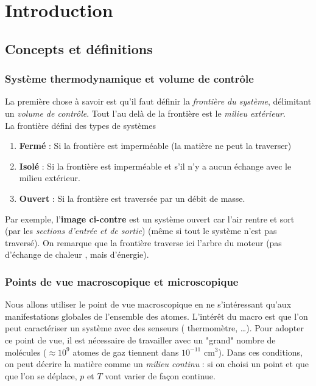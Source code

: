 \chapter{Introduction} 

	\setcounter{section}{1}
\section{Concepts et définitions}
	\subsection{Système thermodynamique et volume de contrôle}
	La première chose à savoir est qu'il faut définir la \textit{frontière 
	du système}, délimitant un \textit{volume de contrôle}. Tout l'au delà 
	de la frontière est le \textit{milieu extérieur}.\\
	
	La frontière défini des types de systèmes
	\begin{enumerate}
	\item \textbf{Fermé} : Si la frontière est imperméable (la matière ne 
	peut la traverser)
	\item \textbf{Isolé} : Si la frontière est imperméable et s'il n'y a 
	aucun échange avec le milieu extérieur.
	\item \textbf{Ouvert} : Si la frontière est traversée par un débit de 
	masse.
	\end{enumerate}

	Par exemple, l'\textbf{image ci-contre} est un système ouvert car l'air 
	rentre et sort (par les \textit{sections d'entrée et de sortie}) (même 
	si tout le système n'est pas traversé). On remarque que la frontière 
	traverse ici l'arbre du moteur (pas d'échange de chaleur , mais 
	d'énergie).
	
	
	\subsection{Points de vue macroscopique et microscopique}
	Nous allons utiliser le point de vue macroscopique en ne s'intéressant  
	qu'aux manifestations globales de l'ensemble des atomes. L'intérêt du 
	macro est que l'on peut caractériser un système avec des senseurs (
	thermomètre, \dots). Pour adopter ce point de vue, il est nécessaire 
	de travailler avec un "grand" nombre de molécules ($\approx 10^9$ atomes 
	de gaz tiennent dans $10^{-11}$ cm$^3$). Dans ces conditions, on peut 
	décrire la matière comme un \textit{milieu continu} : si on choisi un 
	point et que que l'on se déplace, $p$ et $T$ vont varier de façon 
	continue.
	
